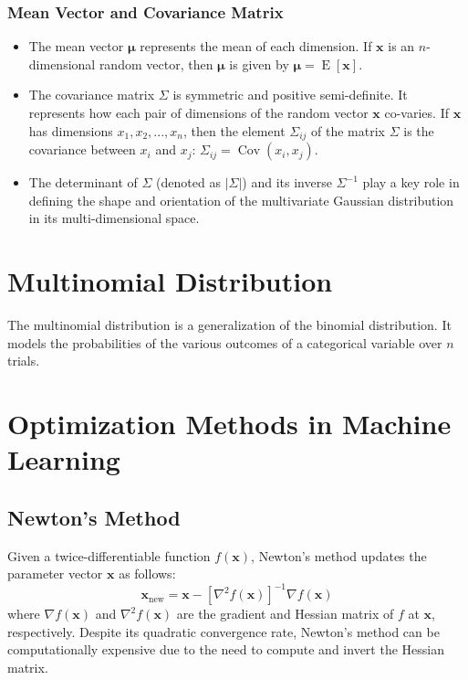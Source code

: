 \documentclass[8pt, a4paper, landscape, includeheadfoot]{extarticle}
\begin{document}
\begin{multicols*}{4}
	\subsubsection{Mean Vector and Covariance Matrix}{}
	\begin{itemize}
		\item The mean vector \(\boldsymbol{\mu}\) represents the mean of each dimension. If \(\mathbf{x}\) is an \(n\)-dimensional random vector, then \(\boldsymbol{\mu}\) is given by \(\boldsymbol{\mu} = \operatorname{E}[\mathbf{x}]\).
		\item The covariance matrix \(\Sigma\) is symmetric and positive semi-definite. It represents how each pair of dimensions of the random vector \(\mathbf{x}\) co-varies. If \(\mathbf{x}\) has dimensions \(x_1, x_2, ..., x_n\), then the element \(\Sigma_{ij}\) of the matrix \(\Sigma\) is the covariance between \(x_i\) and \(x_j\): \(\Sigma_{ij} = \operatorname{Cov}(x_i, x_j)\).
		\item The determinant of \(\Sigma\) (denoted as \(|\Sigma|\)) and its inverse \(\Sigma^{-1}\) play a key role in defining the shape and orientation of the multivariate Gaussian distribution in its multi-dimensional space.
	\end{itemize}

	\section{Multinomial Distribution}
	The multinomial distribution is a generalization of the binomial distribution. It models the probabilities of the various outcomes of a categorical variable over $n$ trials.

	\section{Optimization Methods in Machine Learning}

	\subsection{Newton's Method}
	Given a twice-differentiable function \(f(\mathbf{x})\), Newton's method updates the parameter vector \(\mathbf{x}\) as follows:
	\[
		\mathbf{x}_{\text{new}} = \mathbf{x} - \left[\nabla^2 f(\mathbf{x})\right]^{-1} \nabla f(\mathbf{x})
	\]
	where \(\nabla f(\mathbf{x})\) and \(\nabla^2 f(\mathbf{x})\) are the gradient and Hessian matrix of \(f\) at \(\mathbf{x}\), respectively. Despite its quadratic convergence rate, Newton's method can be computationally expensive due to the need to compute and invert the Hessian matrix.


\end{multicols*}
\end{document}
